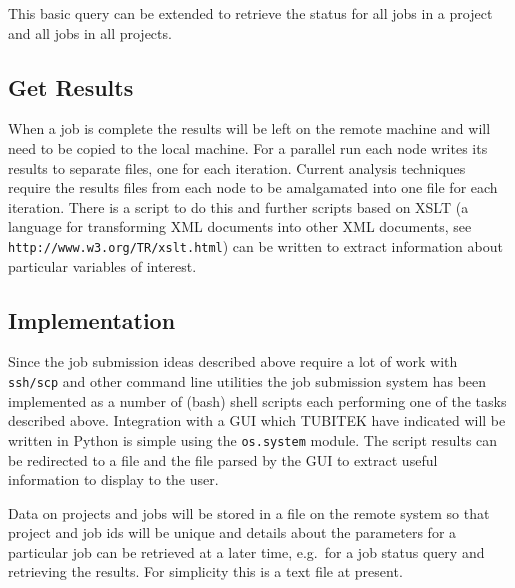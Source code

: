 This basic query can be extended to retrieve the status for all jobs in a project and all jobs in all projects.

\subsection{Get Results}

When a job is complete the results will be left on the remote machine and will need to be copied to the local machine. For a parallel run each node writes its results to separate files, one for each iteration. Current analysis techniques require the results files from each node to be amalgamated into one file for each iteration. There is a script to do this and further scripts based on XSLT (a language for transforming XML documents into other XML documents, see \verb+http://www.w3.org/TR/xslt.html+) can be written to extract information about particular variables of interest.

\subsection{Implementation}

Since the job submission ideas described above require a lot of work with \texttt{ssh/scp} and other command line utilities the job submission system has been implemented as a number of (bash) shell scripts each performing one of the tasks described above. Integration with a GUI which TUBITEK have indicated will be written in Python is simple using the \texttt{os.system} module. The script results can be redirected to a file and the file parsed by the GUI to extract useful information to display to the user.

Data on projects and jobs will be stored in a file on the remote system so that project and job ids will be unique and details about the parameters for a particular job can be retrieved at a later time, e.g.\ for a job status query and retrieving the results. For simplicity this is a text file at present.
